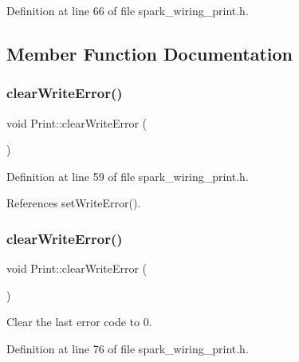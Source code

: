 Definition at line 66 of file spark\+\_\+wiring\+\_\+print.\+h.



\subsection{Member Function Documentation}
\mbox{\label{class_print_aec9ecf84cc6d9087a650def3cefc459e}} 
\subsubsection{\texorpdfstring{clear\+Write\+Error()}{clearWriteError()}\hspace{0.1cm}{\footnotesize\ttfamily [1/2]}}
{\footnotesize\ttfamily void Print\+::clear\+Write\+Error (\begin{DoxyParamCaption}{ }\end{DoxyParamCaption})\hspace{0.3cm}{\ttfamily [inline]}}



Definition at line 59 of file spark\+\_\+wiring\+\_\+print.\+h.



References set\+Write\+Error().

\mbox{\label{class_print_aec9ecf84cc6d9087a650def3cefc459e}} 
\subsubsection{\texorpdfstring{clear\+Write\+Error()}{clearWriteError()}\hspace{0.1cm}{\footnotesize\ttfamily [2/2]}}
{\footnotesize\ttfamily void Print\+::clear\+Write\+Error (\begin{DoxyParamCaption}{ }\end{DoxyParamCaption})\hspace{0.3cm}{\ttfamily [inline]}}



Clear the last error code to 0. 



Definition at line 76 of file spark\+\_\+wiring\+\_\+print.\+h.

